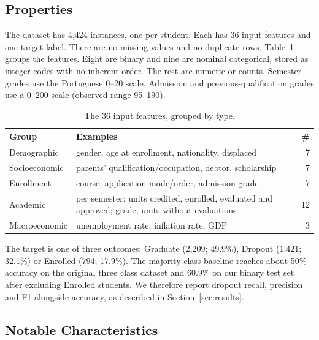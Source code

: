 \documentclass[11pt]{article}
\begin{document}
\subsection{Properties}

The dataset has 4,424 instances, one per student.
Each has 36 input features and one target label.
There are no missing values and no duplicate rows.
Table~\ref{tab:feature-groups} groups the features.
Eight are binary and nine are nominal categorical, stored as integer codes with no inherent order.
The rest are numeric or counts.
Semester grades use the Portuguese 0--20 scale.
Admission and previous-qualification grades use a 0--200 scale (observed range 95--190).

\begin{table}[t]
  \centering
  \small
  \setlength{\tabcolsep}{4pt}
  \begin{tabular}{l>{\raggedright\arraybackslash}p{4.3cm}r}
    \hline
    \textbf{Group} & \textbf{Examples} & \textbf{\#} \\
    \hline
    Demographic   & gender, age at enrollment, nationality, displaced & 7 \\
    Socioeconomic & parents' qualification/occupation, debtor, scholarship & 7 \\
    Enrollment    & course, application mode/order, admission grade & 7 \\
    Academic      & per semester: units credited, enrolled, evaluated and approved; grade; units without evaluations & 12 \\
    Macroeconomic & unemployment rate, inflation rate, GDP & 3 \\
    \hline
  \end{tabular}
  \caption{\label{tab:feature-groups}
    The 36 input features, grouped by type.
  }
\end{table}

The target is one of three outcomes: Graduate (2,209; 49.9\%), Dropout (1,421; 32.1\%) or Enrolled (794; 17.9\%).
The majority-class baseline reaches about 50\% accuracy on the original three class dataset and 60.9\% on our binary test set after excluding Enrolled students.
We therefore report dropout recall, precision and F1 alongside accuracy, as described in Section~\ref{sec:results}.

\subsection{Notable Characteristics}
\end{document}
